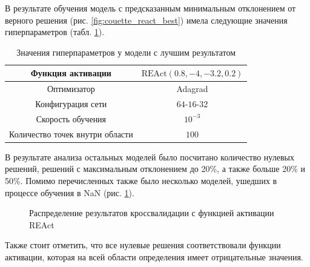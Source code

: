 В результате обучения модель с предсказанным минимальным отклонением от
верного решения (рис. \ref{fig:couette_react_best}) имела следующие значения
гиперпараметров (табл. \ref{table:couette_react_best_params}).

\begin{table}[h!]
    \centering
    \begin{tabular}{ |c|c| } 
        \hline
        Функция активации & $\text{REAct}(0.8, -4, -3.2, 0.2)$ \\
        \hline
        Оптимизатор & Adagrad \\ 
        \hline
        Конфигурация сети & $64$-$16$-$32$ \\ 
        \hline
        Скорость обучения & $10^{-3}$ \\ 
        \hline
        Количество точек внутри области & $100$ \\ 
        \hline
    \end{tabular}
    \caption{Значения гиперпараметров у модели с лучшим результатом}
    \label{table:couette_react_best_params}
\end{table}

В результате анализа остальных моделей было посчитано количество нулевых
решений, решений с максимальным отклонением до 20\%, а также больше 20\% и 50\%.
Помимо перечисленных также было несколько моделей, ушедших в процессе обучения в
NaN (рис. \ref{fig:couette_react_stat}). 

\begin{figure}[ht]
    \centering
    \caption{Распределение результатов кроссвалидации с функцией активации REAct}
    \label{fig:couette_react_stat}
\end{figure}

Также стоит отметить, что все нулевые решения соответствовали функции активации,
которая на всей области определения имеет отрицательные значения.

